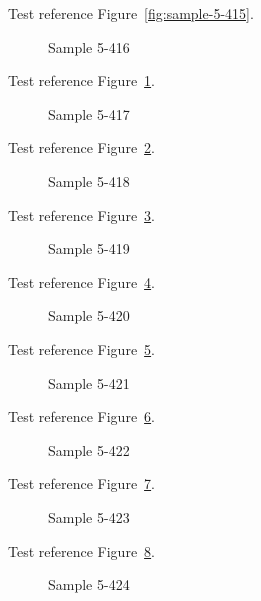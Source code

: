 Test reference Figure~\ref{fig:sample-5-415}.

\begin{figure}[tbhp]
\caption{Sample 5-416}
\label{fig:sample-5-416}
\end{figure}

Test reference Figure~\ref{fig:sample-5-416}.

\begin{figure}[tbhp]
\caption{Sample 5-417}
\label{fig:sample-5-417}
\end{figure}

Test reference Figure~\ref{fig:sample-5-417}.

\begin{figure}[tbhp]
\caption{Sample 5-418}
\label{fig:sample-5-418}
\end{figure}

Test reference Figure~\ref{fig:sample-5-418}.

\begin{figure}[tbhp]
\caption{Sample 5-419}
\label{fig:sample-5-419}
\end{figure}

Test reference Figure~\ref{fig:sample-5-419}.

\begin{figure}[tbhp]
\caption{Sample 5-420}
\label{fig:sample-5-420}
\end{figure}

Test reference Figure~\ref{fig:sample-5-420}.

\begin{figure}[tbhp]
\caption{Sample 5-421}
\label{fig:sample-5-421}
\end{figure}

Test reference Figure~\ref{fig:sample-5-421}.

\begin{figure}[tbhp]
\caption{Sample 5-422}
\label{fig:sample-5-422}
\end{figure}

Test reference Figure~\ref{fig:sample-5-422}.

\begin{figure}[tbhp]
\caption{Sample 5-423}
\label{fig:sample-5-423}
\end{figure}

Test reference Figure~\ref{fig:sample-5-423}.

\begin{figure}[tbhp]
\caption{Sample 5-424}
\label{fig:sample-5-424}
\end{figure}

